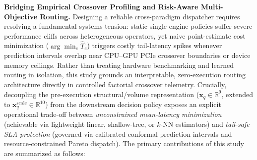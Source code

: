 \documentclass[10pt,a4paper]{article}
\begin{document}
\noindent\textbf{Bridging Empirical Crossover Profiling and Risk-Aware Multi-Objective Routing.}
Designing a reliable cross-paradigm dispatcher requires resolving a fundamental systems tension: static single-engine policies suffer severe performance cliffs across heterogeneous operators, yet naive point-estimate cost minimization ($\arg\min_e \hat{T}_e$) triggers costly tail-latency spikes whenever prediction intervals overlap near CPU--GPU PCIe crossover boundaries or device memory ceilings. Rather than treating hardware benchmarking and learned routing in isolation, this study grounds an interpretable, zero-execution routing architecture directly in controlled factorial crossover telemetry. Crucially, decoupling the pre-execution structural/volume representation ($\mathbf{x}_q \in \mathbb{R}^9$, extended to $\mathbf{x}_q^{\text{scale}}\in\mathbb{R}^{10}$) from the downstream decision policy exposes an explicit operational trade-off between \emph{unconstrained mean-latency minimization} (achievable via lightweight linear, shallow-tree, or $k$-NN estimators) and \emph{tail-safe SLA protection} (governed via calibrated conformal prediction intervals and resource-constrained Pareto dispatch). The primary contributions of this study are summarized as follows:
\end{document}
